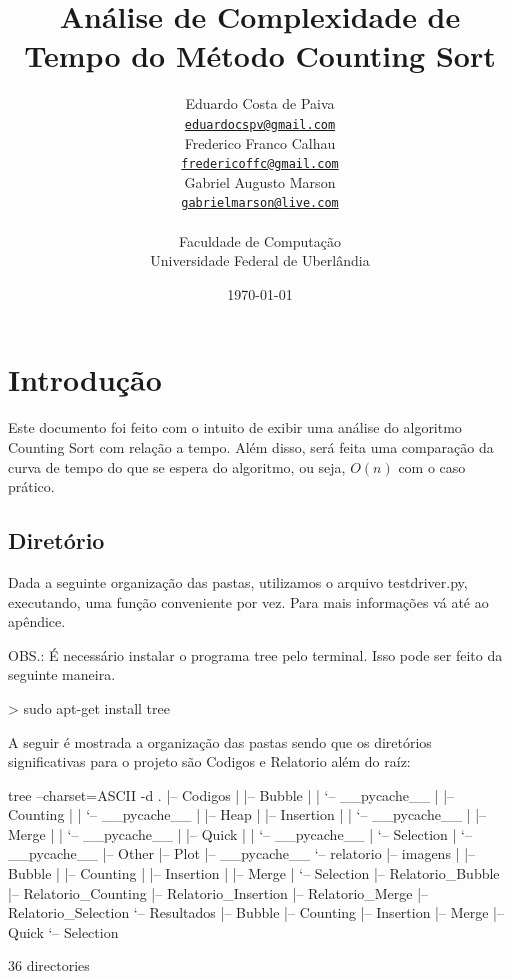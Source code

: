 \documentclass[12pt,a4paper,twoside]{report}
\title{Análise de Complexidade de Tempo do Método Counting Sort}
\date{}
\author{Eduardo Costa de Paiva \\
\texttt{\small \url{eduardocspv@gmail.com}}\\
Frederico Franco Calhau \\
\texttt{\small \url{fredericoffc@gmail.com}}\\
Gabriel Augusto Marson \\
\texttt{\small \url{gabrielmarson@live.com}}\\
\vspace{1cm} \\
Faculdade de Computação \\
Universidade Federal de Uberlândia
}
\date{\today}
\begin{document}
  \maketitle
\listoffigures
\listoftables
\lstlistoflistings

\tableofcontents


\fancyhead[RE,LO]{\thesection}

\setlength{\parskip}{0.15in} %

\chapter{Introdução}
Este documento foi feito com o intuito de exibir uma análise do algoritmo Counting Sort
com relação a tempo. Além disso, será feita uma comparação da curva de tempo do que se espera do
algoritmo, ou seja, $O(n)$ com o caso prático.

\section{Diretório}

Dada a seguinte organização das pastas, utilizamos o arquivo testdriver.py,  executando, uma função conveniente por vez. Para mais informações vá até ao apêndice.

OBS.: É necessário instalar o programa tree pelo terminal. Isso pode ser feito da seguinte maneira.

\begin{terminal}
> sudo apt-get install tree
\end{terminal}

A seguir é mostrada a organização das pastas sendo que os diretórios significativas para o projeto são Codigos e Relatorio além do raíz:
\begin{terminal}

tree --charset=ASCII -d
.
|-- Codigos
|   |-- Bubble
|   |   `-- __pycache__
|   |-- Counting
|   |   `-- __pycache__
|   |-- Heap
|   |-- Insertion
|   |   `-- __pycache__
|   |-- Merge
|   |   `-- __pycache__
|   |-- Quick
|   |   `-- __pycache__
|   `-- Selection
|       `-- __pycache__
|-- Other
|-- Plot
|-- __pycache__
`-- relatorio
    |-- imagens
    |   |-- Bubble
    |   |-- Counting
    |   |-- Insertion
    |   |-- Merge
    |   `-- Selection
    |-- Relatorio_Bubble
    |-- Relatorio_Counting
    |-- Relatorio_Insertion
    |-- Relatorio_Merge
    |-- Relatorio_Selection
    `-- Resultados
        |-- Bubble
        |-- Counting
        |-- Insertion
        |-- Merge
        |-- Quick
        `-- Selection

36 directories


\end{terminal}
\end{document}
